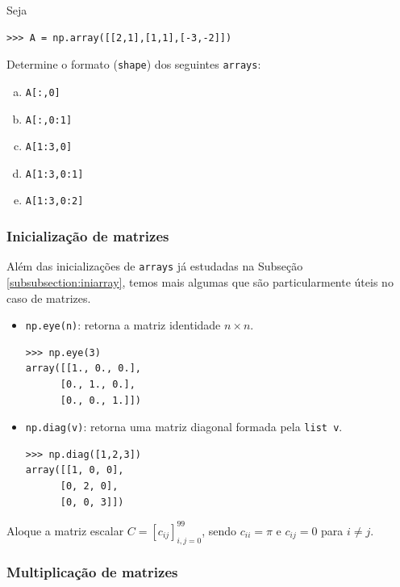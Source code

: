 \documentclass[12pt]{article}
\begin{document}
\begin{exr}
  Seja

\begin{lstlisting}
>>> A = np.array([[2,1],[1,1],[-3,-2]])
\end{lstlisting}

  Determine o formato (\lstinline+shape+) dos seguintes \lstinline+arrays+:
  \begin{enumerate}[a)]
  \item \lstinline+A[:,0]+
  \item \lstinline+A[:,0:1]+
  \item \lstinline+A[1:3,0]+
  \item \lstinline+A[1:3,0:1]+
  \item \lstinline+A[1:3,0:2]+
  \end{enumerate}
\end{exr}

\subsubsection{Inicialização de matrizes}

Além das inicializações de \lstinline+arrays+ já estudadas na Subseção \ref{subsubsection:iniarray}, temos mais algumas que são particularmente úteis no caso de matrizes.
\begin{itemize}
\item \lstinline+np.eye(n)+: retorna a matriz identidade $n\times n$.

\begin{lstlisting}
>>> np.eye(3)
array([[1., 0., 0.],
      [0., 1., 0.],
      [0., 0., 1.]])
\end{lstlisting}

   \item \lstinline+np.diag(v)+: retorna uma matriz diagonal formada pela \lstinline+list v+.

\begin{lstlisting}
>>> np.diag([1,2,3])
array([[1, 0, 0],
      [0, 2, 0],
      [0, 0, 3]])
\end{lstlisting}

  \end{itemize}

 \begin{exr}
   Aloque a matriz escalar $C = [c_{ij}]_{i,j=0}^{99}$, sendo $c_{ii}=\pi$ e $c_{ij}=0$ para $i\neq j$.
 \end{exr}

\subsubsection{Multiplicação de matrizes}
\end{document}
